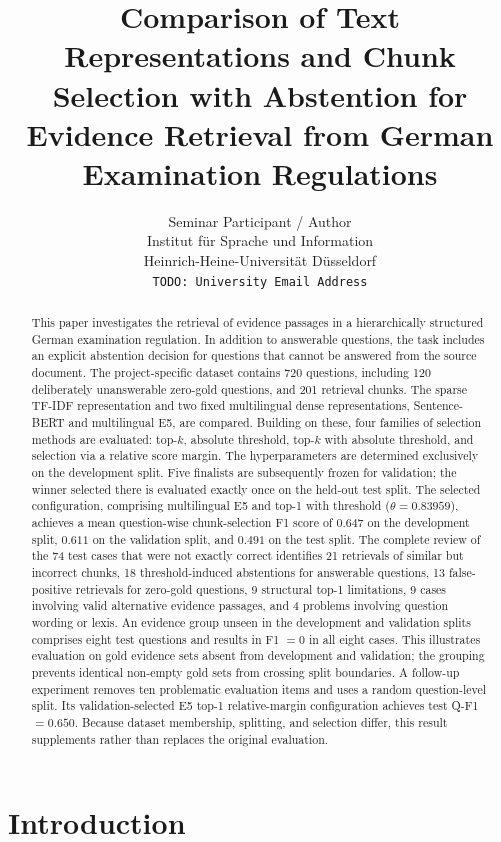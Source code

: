 \documentclass[11pt]{article}
\title{Comparison of Text Representations and Chunk Selection with Abstention for Evidence Retrieval from German Examination Regulations}
\author{Seminar Participant / Author \\
  Institut für Sprache und Information \\
  Heinrich-Heine-Universität Düsseldorf \\
  \texttt{TODO: University Email Address}}
\newcommand{\revision}[1]{{\color{blue}#1}}
\begin{document}
\maketitle

\begin{abstract}
This paper investigates the retrieval of evidence passages in a hierarchically structured German examination regulation. In addition to answerable questions, the task includes an explicit abstention decision for questions that cannot be answered from the source document. The project-specific dataset contains 720 questions, including 120 deliberately unanswerable zero-gold questions, and 201 retrieval chunks. The sparse TF-IDF representation and two fixed multilingual dense representations, Sentence-BERT and multilingual E5, are compared. Building on these, four families of selection methods are evaluated: top-$k$, absolute threshold, top-$k$ with absolute threshold, and selection via a relative score margin. The hyperparameters are determined exclusively on the development split. Five finalists are subsequently frozen for validation; the winner selected there is evaluated exactly once on the held-out test split. The selected configuration, comprising multilingual E5 and top-1 with threshold ($\theta=0.83959$), achieves a mean question-wise chunk-selection F1 score of $0.647$ on the development split, $0.611$ on the validation split, and $0.491$ on the test split. The complete review of the 74 test cases that were not exactly correct identifies 21 retrievals of similar but incorrect chunks, 18 threshold-induced abstentions for answerable questions, 13 false-positive retrievals for zero-gold questions, 9 structural top-1 limitations, 9 cases involving valid alternative evidence passages, and 4 problems involving question wording or lexis. An evidence group unseen in the development and validation splits comprises eight test questions and results in F1 $=0$ in all eight cases. \revision{This illustrates evaluation on gold evidence sets absent from development and validation; the grouping prevents identical non-empty gold sets from crossing split boundaries. A follow-up experiment removes ten problematic evaluation items and uses a random question-level split. Its validation-selected E5 top-1 relative-margin configuration achieves test Q-F1 $=0.650$. Because dataset membership, splitting, and selection differ, this result supplements rather than replaces the original evaluation.}
\end{abstract}


\section{Introduction}
\end{document}
